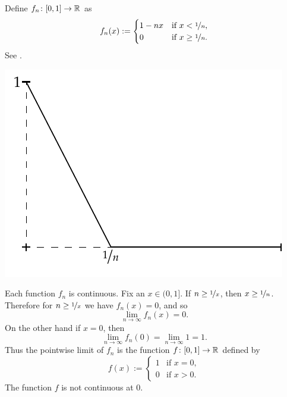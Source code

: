 \begin{example}
Define $f_n \colon [0,1] \to {\mathbb{R}}$ as
\begin{equation*}
f_n(x) :=
\begin{cases}
1-nx &  \text{if } x < \nicefrac{1}{n},\\
0 &  \text{if } x \geq \nicefrac{1}{n}.
\end{cases}
\end{equation*}
See .

\begin{myfigureht}
\includegraphics{figures/contconvcntr}
\caption{Graph of $f_n(x)$.%
\label{contconvcntr:fig}}
\end{myfigureht}

Each function $f_n$ is continuous.
Fix an $x \in (0,1]$.  If $n \geq \nicefrac{1}{x}$,
then $x \geq \nicefrac{1}{n}$.  Therefore for $n \geq \nicefrac{1}{x}$
we have $f_n(x) = 0$, and so
\begin{equation*}
\lim_{n \to \infty} f_n(x) = 0.
\end{equation*}
On the other hand if $x=0$, then
\begin{equation*}
\lim_{n \to \infty} f_n(0) = 
\lim_{n \to \infty} 1 = 1.
\end{equation*}
Thus the pointwise limit of $f_n$ is the function
$f \colon [0,1] \to {\mathbb{R}}$ defined by
\begin{equation*}
f(x) :=
\begin{cases}
1 &  \text{if } x = 0,\\
0 &  \text{if } x > 0.
\end{cases}
\end{equation*}
The function $f$ is not continuous at 0.
\end{example}

